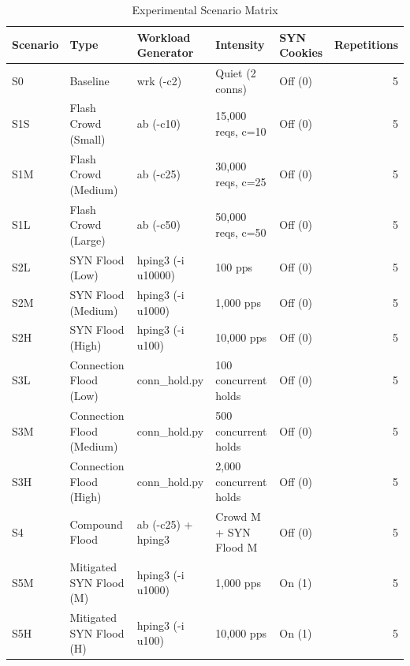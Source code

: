 \begin{table}
\caption{Experimental Scenario Matrix}
\label{tab:t1}
\begin{tabular}{lllllr}
\toprule
Scenario & Type & Workload Generator & Intensity & SYN Cookies & Repetitions \\
\midrule
S0 & Baseline & wrk (-c2) & Quiet (2 conns) & Off (0) & 5 \\
S1S & Flash Crowd (Small) & ab (-c10) & 15,000 reqs, c=10 & Off (0) & 5 \\
S1M & Flash Crowd (Medium) & ab (-c25) & 30,000 reqs, c=25 & Off (0) & 5 \\
S1L & Flash Crowd (Large) & ab (-c50) & 50,000 reqs, c=50 & Off (0) & 5 \\
S2L & SYN Flood (Low) & hping3 (-i u10000) & 100 pps & Off (0) & 5 \\
S2M & SYN Flood (Medium) & hping3 (-i u1000) & 1,000 pps & Off (0) & 5 \\
S2H & SYN Flood (High) & hping3 (-i u100) & 10,000 pps & Off (0) & 5 \\
S3L & Connection Flood (Low) & conn_hold.py & 100 concurrent holds & Off (0) & 5 \\
S3M & Connection Flood (Medium) & conn_hold.py & 500 concurrent holds & Off (0) & 5 \\
S3H & Connection Flood (High) & conn_hold.py & 2,000 concurrent holds & Off (0) & 5 \\
S4 & Compound Flood & ab (-c25) + hping3 & Crowd M + SYN Flood M & Off (0) & 5 \\
S5M & Mitigated SYN Flood (M) & hping3 (-i u1000) & 1,000 pps & On (1) & 5 \\
S5H & Mitigated SYN Flood (H) & hping3 (-i u100) & 10,000 pps & On (1) & 5 \\
\bottomrule
\end{tabular}
\end{table}
